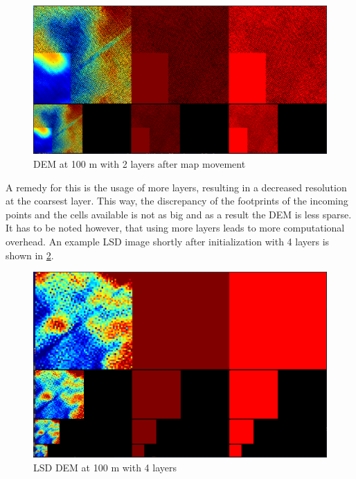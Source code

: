 \begin{figure}[h]
\centering
\includegraphics[scale=0.24]{images/evaluation/LSD_layer_analysis/2_layers_3.png}
\caption{DEM at 100 m with 2 layers after map movement}
\label{fig:lsd_2_layers_3}
\end{figure}

A remedy for this is the usage of more layers, resulting in a decreased resolution at the coarsest layer. This way, the discrepancy of the footprints of the incoming points and the cells available is not as big and as a result the DEM is less sparse. It has to be noted however, that using more layers leads to more computational overhead. An example LSD image shortly after initialization with 4 layers is shown in \cref{fig:lsd_4_layers_1}.

\begin{figure}[h]
\centering
\includegraphics[scale=0.24]{images/evaluation/LSD_layer_analysis/4_layers_1.png}
\caption{LSD DEM at 100 m with 4 layers}
\label{fig:lsd_4_layers_1}
\end{figure}

